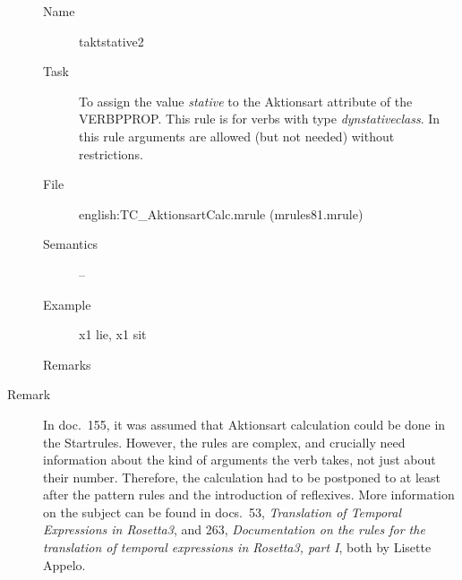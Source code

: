 \begin{description}
\vspace{1 cm}
\begin{description}
\item[Name] taktstative2
\item[Task] To assign the value {\em stative\/} to the Aktionsart attribute of 
the VERBPPROP. This rule is for verbs with type {\em dynstativeclass}.
In this rule arguments are allowed (but not needed) without restrictions.
\item[File] english:TC\_AktionsartCalc.mrule (mrules81.mrule)
\item[Semantics] --
\item[Example] x1 lie, x1 sit
\item[Remarks]
\end{description}

\vspace{1 cm}
\item[Remark] In doc.\ 155, it was assumed that Aktionsart calculation could be 
done in the Startrules. However, the rules are complex, and crucially need 
information about the kind of arguments the verb takes, not just about their 
number. Therefore, the calculation had to be postponed to at least after the 
pattern rules and the introduction of reflexives. More information on the 
subject can be found in docs.\ 53, {\em Translation of Temporal Expressions in 
Rosetta3\/}, and 263, {\em Documentation on the rules for the translation of 
temporal expressions in Rosetta3, part I\/}, both by Lisette Appelo.
\end{description}



